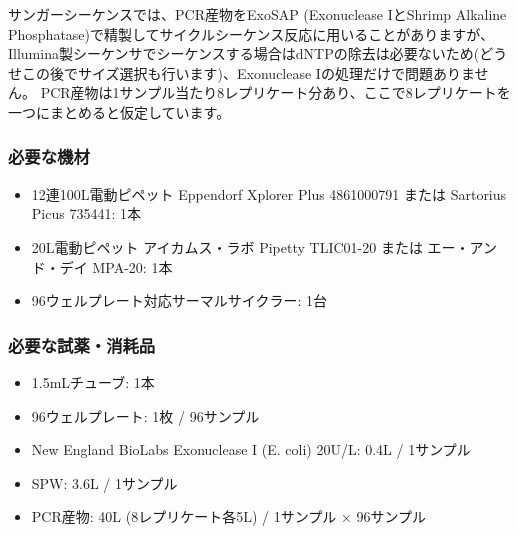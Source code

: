 \documentclass[titlepage,10pt,a4paper]{jsbook}
\begin{document}
サンガーシーケンスでは、PCR産物をExoSAP (Exonuclease IとShrimp Alkaline Phosphatase)で精製してサイクルシーケンス反応に用いることがありますが、Illumina製シーケンサでシーケンスする場合はdNTPの除去は必要ないため(どうせこの後でサイズ選択も行います)、Exonuclease Iの処理だけで問題ありません。
PCR産物は1サンプル当たり8レプリケート分あり、ここで8レプリケートを一つにまとめると仮定しています。

\subsubsection{必要な機材}
\begin{itemize}
\item 12連100{\textmu}L電動ピペット Eppendorf Xplorer Plus 4861000791 または Sartorius Picus 735441: 1本
\item 20{\textmu}L電動ピペット アイカムス・ラボ Pipetty TLIC01-20 または エー・アンド・デイ MPA-20: 1本
\item 96ウェルプレート対応サーマルサイクラー: 1台
\end{itemize}

\subsubsection{必要な試薬・消耗品}
\begin{itemize}
\item 1.5mLチューブ: 1本
\item 96ウェルプレート: 1枚 / 96サンプル
\item New England BioLabs Exonuclease I (E. coli) 20U/{\textmu}L: 0.4{\textmu}L / 1サンプル
\item SPW: 3.6{\textmu}L / 1サンプル
\item PCR産物: 40{\textmu}L (8レプリケート各5{\textmu}L) / 1サンプル × 96サンプル
\end{itemize}
\end{document}
